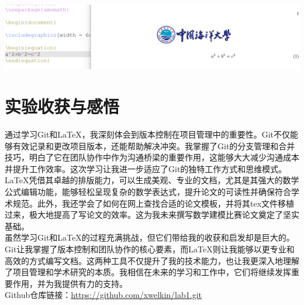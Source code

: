 \documentclass[UTF8,a4paper]{ctexart}
\begin{document}
\begin{sloppypar}
	\includegraphics[width = 16cm]{20}

	\section{实验收获与感悟}
	通过学习Git和LaTeX，我深刻体会到版本控制在项目管理中的重要性。Git不仅能够有效记录和更改项目版本，还能帮助解决冲突。我掌握了Git的分支管理和合并技巧，明白了它在团队协作中作为沟通桥梁的重要作用，这能够大大减少沟通成本并提升工作效率。这次学习让我进一步适应了Git的独特工作方式和思维模式。\\
	\indent LaTeX凭借其卓越的排版能力，可以生成美观、专业的文档，尤其是其强大的数学公式编辑功能，能够轻松呈现复杂的数学表达式，提升论文的可读性并确保符合学术规范。此外，我还学会了如何在网上查找合适的论文模板，并将其tex文件移植过来，极大地提高了写论文的效率。这为我未来撰写数学建模比赛论文奠定了坚实基础。\\
	\indent 虽然学习Git和LaTeX的过程充满挑战，但它们带给我的收获和启发却是巨大的。Git让我掌握了版本控制和团队协作的核心要素，而LaTeX则让我能够以更专业和高效的方式编写文档。这两种工具不仅提升了我的技术能力，也让我更深入地理解了项目管理和学术研究的本质。我相信在未来的学习和工作中，它们将继续发挥重要作用，并为我提供有力的支持。\\
	
	Github仓库链接：\url{https://github.com/xwelkin/lab1.git}
	
\end{sloppypar}
\end{document}
